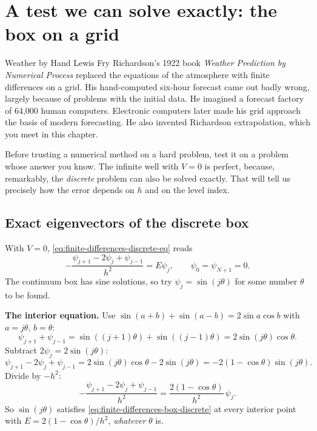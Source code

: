 \section{A test we can solve exactly: the box on a grid}\label{sec:finite-differences-box}
\begin{didyouknow}{Weather by Hand}
Lewis Fry Richardson's 1922 book \emph{Weather Prediction by Numerical Process} replaced the equations of the atmosphere with finite differences on a grid. His hand-computed six-hour forecast came out badly wrong, largely because of problems with the initial data. He imagined a forecast factory of 64{,}000 human computers. Electronic computers later made his grid approach the basis of modern forecasting. He also invented Richardson extrapolation, which you meet in this chapter.
\end{didyouknow}

Before trusting a numerical method on a hard problem, test it on a problem whose answer you know. The infinite well with $V=0$ is perfect, because, remarkably, the \emph{discrete} problem can also be solved exactly. That will tell us precisely how the error depends on $h$ and on the level index.

\subsection{Exact eigenvectors of the discrete box}

With $V=0$, \eqref{eq:finite-differences-discrete-eq} reads
\begin{equation}
-\frac{\psi_{j+1}-2\psi_j+\psi_{j-1}}{h^2}=E\psi_j,\qquad \psi_0=\psi_{N+1}=0.
\label{eq:finite-differences-box-discrete}
\end{equation}
The continuum box has sine solutions, so try $\psi_j=\sin(j\theta)$ for some number $\theta$ to be found.

\textbf{The interior equation.} Use $\sin(a+b)+\sin(a-b)=2\sin a\cos b$ with $a=j\theta$, $b=\theta$:
\begin{equation*}
\psi_{j+1}+\psi_{j-1}=\sin((j+1)\theta)+\sin((j-1)\theta)=2\sin(j\theta)\cos\theta.
\end{equation*}
Subtract $2\psi_j=2\sin(j\theta)$:
\begin{equation*}
\psi_{j+1}-2\psi_j+\psi_{j-1}=2\sin(j\theta)\cos\theta-2\sin(j\theta)=-2(1-\cos\theta)\sin(j\theta).
\end{equation*}
Divide by $-h^2$:
\begin{equation*}
-\frac{\psi_{j+1}-2\psi_j+\psi_{j-1}}{h^2}=\frac{2(1-\cos\theta)}{h^2}\,\psi_j.
\end{equation*}
So $\sin(j\theta)$ satisfies \eqref{eq:finite-differences-box-discrete} at every interior point with $E=2(1-\cos\theta)/h^2$, \emph{whatever} $\theta$ is.

